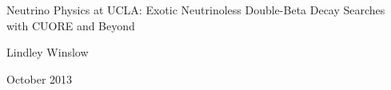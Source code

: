 \documentclass[11pt,letterpaper]{article}
\begin{document}
\begin{titlepage}
\begin{center}
{\LARGE Neutrino Physics at UCLA: Exotic Neutrinoless Double-Beta Decay Searches with CUORE and Beyond}

{\Large Lindley Winslow}

\vfill
{\Large October 2013}
\end{center}
\end{titlepage}

\tableofcontents
\setcounter{page}{0}


\setcounter{page}{1}


\setcounter{page}{1}


%


\setcounter{page}{1}


\setcounter{page}{1}



\setcounter{page}{1}


\setcounter{page}{1}


\setcounter{page}{1}


\setcounter{page}{1}
\end{document}
